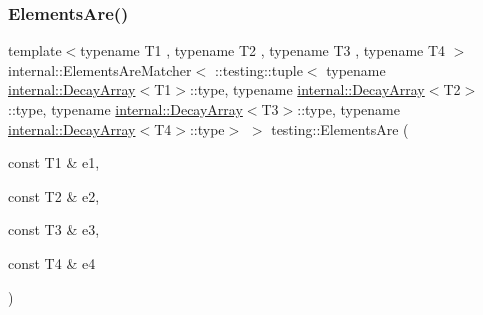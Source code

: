 \mbox{\label{namespacetesting_a4109ce480e0145bfce7c46120afb36d3}} 
\subsubsection{\texorpdfstring{ElementsAre()}{ElementsAre()}\hspace{0.1cm}{\footnotesize\ttfamily [5/11]}}
{\footnotesize\ttfamily template$<$typename T1 , typename T2 , typename T3 , typename T4 $>$ \\
internal\+::\+Elements\+Are\+Matcher$<$ \+::testing\+::tuple$<$ typename \mbox{\hyperlink{structtesting_1_1internal_1_1_decay_array}{internal\+::\+Decay\+Array}}$<$T1$>$\+::type, typename \mbox{\hyperlink{structtesting_1_1internal_1_1_decay_array}{internal\+::\+Decay\+Array}}$<$T2$>$\+::type, typename \mbox{\hyperlink{structtesting_1_1internal_1_1_decay_array}{internal\+::\+Decay\+Array}}$<$T3$>$\+::type, typename \mbox{\hyperlink{structtesting_1_1internal_1_1_decay_array}{internal\+::\+Decay\+Array}}$<$T4$>$\+::type$>$ $>$ testing\+::\+Elements\+Are (\begin{DoxyParamCaption}\item[{const T1 \&}]{e1,  }\item[{const T2 \&}]{e2,  }\item[{const T3 \&}]{e3,  }\item[{const T4 \&}]{e4 }\end{DoxyParamCaption})\hspace{0.3cm}{\ttfamily [inline]}}

\mbox{\label{namespacetesting_aa075d52e84310659ca8636c6e7d5c9b2}} 
